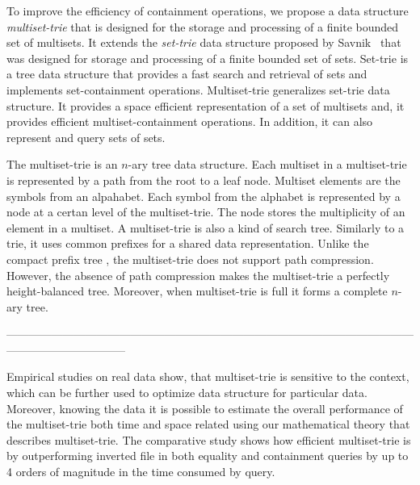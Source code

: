 %
%
To improve the efficiency of containment operations, we propose a data structure \emph{multiset-trie} that is designed for the storage and processing of a finite bounded set of multisets. It extends the \emph{set-trie} data structure proposed by Savnik~\cite{savnik2013index} that was designed for storage and processing of a finite bounded set of sets. 
%
Set-trie is a tree data structure that provides a fast search and retrieval of sets and implements set-containment operations. Multiset-trie generalizes set-trie data structure. It provides a space efficient representation of a set of multisets and, it provides efficient multiset-containment operations. In addition, it can also represent and query sets of sets.

The multiset-trie is an $n$-ary tree data structure. Each multiset in a multiset-trie is represented by a path from the root to a leaf node. Multiset elements are the symbols from an alpahabet. Each symbol from the alphabet is represented by a node at a certan level of the multiset-trie. The node stores the multiplicity of an element in a multiset.
%
%
A multiset-trie is also a kind of search tree. Similarly to a trie, it uses common prefixes for a shared data representation. Unlike the compact prefix tree \cite{patriciaTree}, the multiset-trie does not support path compression. However, the absence of path compression makes the multiset-trie a perfectly height-balanced tree. Moreover, when multiset-trie is full it forms a complete $n$-ary tree.
%

% 
--------------------------------------------------------------------------------------------------------------------------------------------
%

Empirical studies on real data show, that multiset-trie is sensitive to the context, which can 
be further used to optimize data structure for particular data. Moreover, knowing the data 
it is possible to estimate the overall performance of the multiset-trie both time and space 
related using our mathematical theory that describes multiset-trie.
%
The comparative study shows how efficient multiset-trie is by outperforming inverted file in 
both equality and containment queries by up to 4 orders of magnitude in the time consumed by 
query. 

